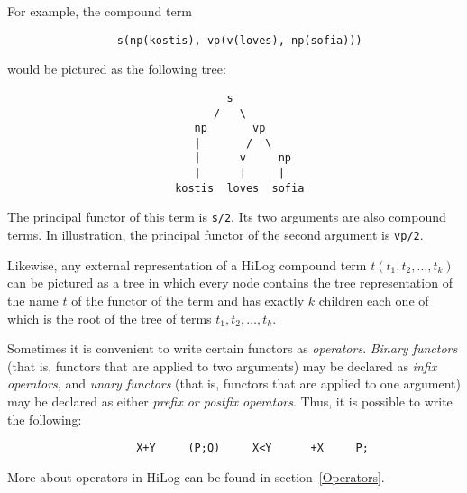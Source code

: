 For example, the compound term
\begin{verbatim}
                 s(np(kostis), vp(v(loves), np(sofia)))
\end{verbatim}
would be pictured as the following tree:

\begin{minipage}{4.0in}
\begin{verbatim}
                                  s
                                /   \
                             np       vp
                             |       /  \
                             |      v     np
                             |      |     |
                          kostis  loves  sofia
\end{verbatim}
\end{minipage}

\noindent
The principal functor of this term is {\tt s/2}.  Its two arguments are also
compound terms.  In illustration, the principal functor of the second
argument is {\tt vp/2}.

Likewise, any external representation of a HiLog compound term
$t(t_1, t_2, \ldots, t_k)$ can be pictured as a tree in which every node
contains the tree representation of the name $t$ of the functor of the term
and has exactly $k$ children each one of which is the root of the tree of
terms $t_1, t_2, \ldots, t_k$.

Sometimes it is convenient to write certain functors as {\em operators}.
{\em Binary functors} (that is, functors that are applied to two arguments)
may be declared as {\em infix operators}, and {\em unary functors} (that is,
functors that are applied to one argument) may be declared as either 
{\em prefix or postfix operators}.  
Thus, it is possible to write the following:
\begin{verbatim}
                    X+Y     (P;Q)     X<Y      +X     P;
\end{verbatim}
More about operators in HiLog can be found in section~\ref{Operators}.


